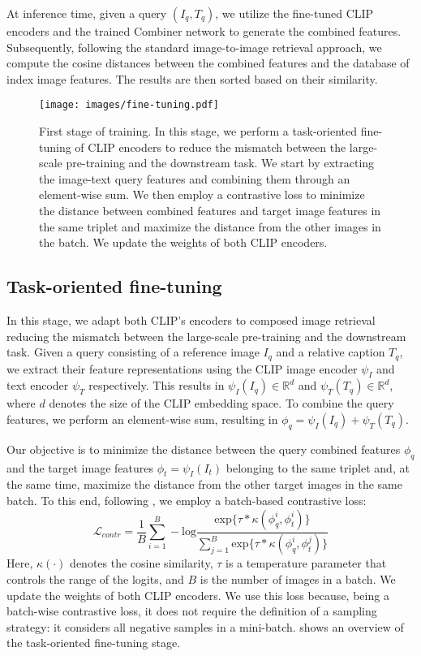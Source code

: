 \documentclass[acmlarge]{acmart}
\begin{document}
At inference time, given a query $(I_q, T_q)$, we utilize the fine-tuned CLIP encoders and the trained Combiner network to generate the combined features. Subsequently, following the standard image-to-image retrieval approach, we compute the cosine distances between the combined features and the database of index image features. The results are then sorted based on their similarity.

\begin{figure*}[t]
  \texttt{[image: images/fine-tuning.pdf]}
  \caption{First stage of training. In this stage, we perform a task-oriented fine-tuning of CLIP encoders to reduce the mismatch between the large-scale pre-training and the downstream task. We start by extracting the 
 image-text query features and combining them through an element-wise sum. We then employ a contrastive loss to minimize the distance between combined features and target image features in the same triplet and maximize the distance from the other images in the batch. We update the weights of both CLIP encoders.}
  \label{fig:fine-tuning}
\vspace{-2.5ex}
\end{figure*}

\subsection{Task-oriented fine-tuning}
In this stage, we adapt both CLIP's encoders to composed image retrieval reducing the mismatch between the large-scale pre-training and the downstream task. 
Given a query consisting of a reference image $I_q$ and a relative caption $T_q$, we extract their feature representations using the CLIP image encoder $\psi_{I}$ and text encoder $\psi_{T}$ respectively. This results in $\psi_{I}(I_q) \in \mathbb{R}^{d}$ and $\psi_{T}(T_q) \in \mathbb{R}^{d}$, where $d$ denotes the size of the CLIP embedding space.
To combine the query features, we perform an element-wise sum, resulting in $\phi_q = \psi_{I}(I_q) + \psi_{T}(T_q)$.

Our objective is to minimize the distance between the query combined features $\phi_q$ and the target image features $\phi_t = \psi_{I}(I_t)$ belonging to the same triplet and, at the same time, maximize the distance from the other target images in the same batch.
To this end, following \cite{vo2019composing, shin2021rtic, Lee_2021_CVPR}, we employ a batch-based contrastive loss:
\begin{equation}
    \mathcal{L}_{contr} = \frac{1}{B} \sum^{B}_{i=1} -\text{log} \frac{\text{exp\{} \tau * \kappa(\phi_q^i, \phi_t^i)\}}{\sum^B_{j=1} \text{exp\{} \tau * \kappa(\phi_q^i, \phi_t^j)\}}
    \label{eq:loss}
\end{equation}
Here, $\kappa(\cdot)$ denotes the cosine similarity, $\tau$ is a temperature parameter that controls the range of the logits, and $B$ is the number of images in a batch. We update the weights of both CLIP encoders.
We use this loss because, being a batch-wise contrastive loss, it does not require the definition of a sampling strategy: it considers all negative samples in a mini-batch.
 shows an overview of the task-oriented fine-tuning stage.
\end{document}
